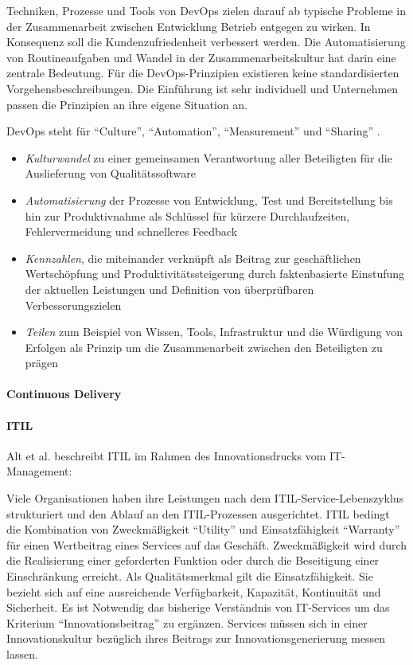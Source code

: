 Techniken, Prozesse und Tools von DevOps zielen darauf ab typische Probleme in der Zusammenarbeit zwischen Entwicklung Betrieb entgegen zu wirken. In Konsequenz soll die Kundenzufriedenheit verbessert werden. Die Automatisierung von Routineaufgaben und Wandel in der Zusammenarbeitskultur hat darin eine zentrale Bedeutung. Für die DevOps-Prinzipien existieren keine standardisierten Vorgehensbeschreibungen. Die Einführung ist sehr individuell und Unternehmen passen die Prinzipien an ihre eigene Situation an. 

DevOps steht für \enquote{Culture}, \enquote{Automation}, \enquote{Measurement} und \enquote{Sharing} \cite{humble:2011}. 
\begin{itemize}
    \item \emph{Kulturwandel} zu einer gemeinsamen Verantwortung aller Beteiligten für die Auslieferung von Qualitätssoftware
    \item \emph{Automatisierung} der Prozesse von Entwicklung, Test und Bereitstellung bis hin zur Produktivnahme als Schlüssel für kürzere Durchlaufzeiten, Fehlervermeidung und schnelleres Feedback
    \item \emph{Kennzahlen}, die miteinander verknüpft als Beitrag zur geschäftlichen Wertschöpfung und Produktivitätssteigerung durch faktenbasierte Einstufung der aktuellen Leistungen und Definition von überprüfbaren Verbesserungszielen
    \item \emph{Teilen} zum Beispiel von Wissen, Tools, Infrastruktur und die Würdigung von Erfolgen als Prinzip um die Zusammenarbeit zwischen den Beteiligten zu prägen
\end{itemize}

\cite{Alt2017}

\paragraph{Continuous Delivery}

\paragraph{ITIL}
Alt et al. beschreibt ITIL im Rahmen des Innovationsdrucks vom IT-Management:

Viele Organisationen haben ihre Leistungen nach dem ITIL-Service-Lebenszyklus strukturiert und den Ablauf an den ITIL-Prozessen ausgerichtet. ITIL bedingt die Kombination von Zweckmäßigkeit \enquote{Utility} und Einsatzfähigkeit \enquote{Warranty} für einen Wertbeitrag eines Services auf das Geschäft. Zweckmäßigkeit wird durch die Realisierung einer geforderten Funktion oder durch die Beseitigung einer Einschränkung erreicht. Als Qualitätsmerkmal gilt die Einsatzfähigkeit. Sie bezieht sich auf eine ausreichende Verfügbarkeit, Kapazität, Kontinuität und Sicherheit. Es ist Notwendig das bisherige Verständnis von IT-Services um das Kriterium \enquote{Innovationsbeitrag} zu ergänzen. Services müssen sich in einer Innovationskultur bezüglich ihres Beitrags zur Innovationsgenerierung messen lassen.

